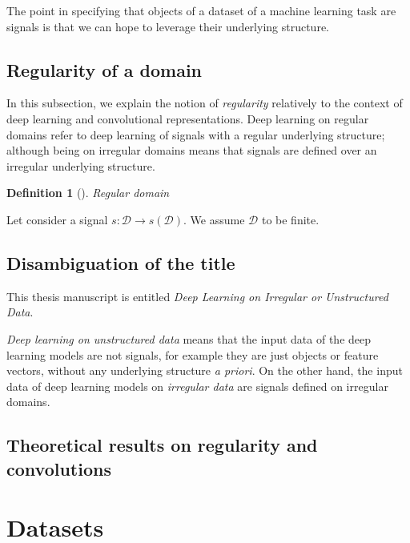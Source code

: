 \documentclass{article}
\newtheorem{definition}{Definition}
\newcommand{\domain}{\mathcal{D}}
\begin{document}
The point in specifying that objects of a dataset of a machine learning task are signals is that we can hope to leverage their underlying structure.



\subsection{Regularity of a domain}
\label{regularity}

In this subsection, we explain the notion of \emph{regularity} relatively to the context of deep learning and convolutional representations. Deep learning on regular domains refer to deep learning of signals with a regular underlying structure; although being on irregular domains means that signals are defined over an irregular underlying structure.


\begin{definition}[]{Regular domain}{}

\end{definition}

Let consider a signal $s: \domain \rightarrow s(\domain)$. We assume $\domain$ to be finite.


\subsection{Disambiguation of the title}

This thesis manuscript is entitled \emph{Deep Learning on Irregular or Unstructured Data}.

\emph{Deep learning on unstructured data} means that the input data of the deep learning models are not signals, for example they are just objects or feature vectors, without any underlying structure \emph{a priori}.
On the other hand, the input data of deep learning models on \emph{irregular data} are signals defined on irregular domains.

\subsection{Theoretical results on regularity and convolutions}


\section{Datasets}
\end{document}
